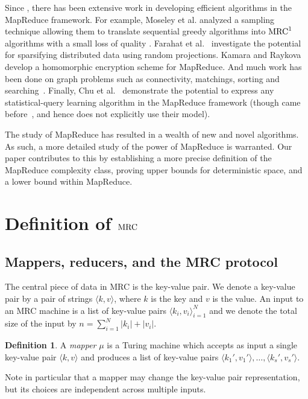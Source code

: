 \documentclass[11pt]{article}
\theoremstyle{definition}
\newtheorem{defn}{Definition}
\theoremstyle{remark}
\newcommand{\mrc}{\textup{MRC}}
\begin{document}
Since \cite{Karloff10}, there has been extensive work in developing efficient
algorithms in the MapReduce framework. For example, Moseley et al. analyzed a
sampling technique allowing them to translate sequential greedy algorithms into
$\mrc^1$ algorithms with a small loss of quality \cite{KMVV13}. Farahat et
al.~\cite{FEGK13} investigate the potential for sparsifying distributed data
using random projections. Kamara and Raykova~\cite{KR13} develop a homomorphic
encryption scheme for MapReduce. And much work has been done on graph problems
such as connectivity, matchings, sorting and searching~\cite{Goodrich11}.
Finally, Chu et al.~\cite{ChuKLYBNO06} demonstrate the potential to express any
statistical-query learning algorithm in the MapReduce framework (though
\cite{ChuKLYBNO06} came before~\cite{Karloff10}, and hence does not explicitly
use their model).

The study of MapReduce has resulted in a wealth of new and novel algorithms. As
such, a more detailed study of the power of MapReduce is warranted. Our paper
contributes to this by establishing a more precise definition of the MapReduce
complexity class, proving upper bounds for deterministic space, and a lower
bound within MapReduce.

\section{Definition of $\mrc$} \label{sec:definition} \subsection{Mappers,
reducers, and the MRC protocol}

The central piece of data in MRC is the key-value pair. We denote a key-value
pair by a pair of strings $\langle k, v \rangle$, where $k$ is the key and $v$
is the value. An input to an MRC machine is a list of key-value pairs $\langle
k_i, v_i \rangle_{i=1}^N$ and we denote the total size of the input by $n =
\sum_{i=1}^N |k_i| + |v_i|$.

\begin{defn} 
A \emph{mapper} $\mu$ is a Turing machine which accepts as input a single
key-value pair $\langle k, v \rangle$ and produces a list of key-value pairs
$\langle k_1', v_1' \rangle, \dots, \langle k_s', v_s' \rangle$.
\end{defn}

Note in particular that a mapper may change the key-value pair representation,
but its choices are independent across multiple inputs.
\end{document}
